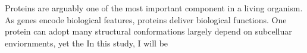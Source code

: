 Proteins are arguably one of the most important component in a living organism. As genes encode biological features, proteins deliver biological functions. One protein can adopt many structural conformations largely depend on subcelluar enviornments, yet the     In this study, I will be 
